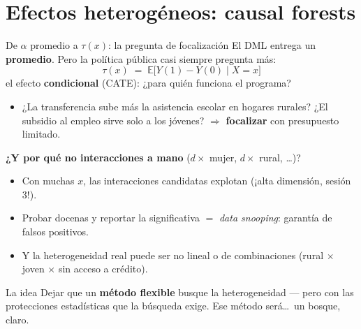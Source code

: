 \documentclass{beamer}
\newcommand{\E}{\mathbb{E}}
\newcommand{\1}{\mathbb{I}}
\begin{document}
\section{Efectos heterogéneos: causal forests}
\begin{frame}[noframenumbering]
\tableofcontents[currentsection]
\end{frame}

\begin{frame}{De $\alpha$ promedio a $\tau(x)$: la pregunta de focalización}
\small
El DML entrega un \textbf{promedio}. Pero la política pública casi siempre pregunta más:
\[ \tau(x) \;=\; \E\big[ Y(1) - Y(0) \mid X = x \big] \]
el efecto \textbf{condicional} (CATE): ¿para quién funciona el programa?
\pause

\begin{itemize}\itemsep4pt
  \item ¿La transferencia sube más la asistencia escolar en hogares rurales? ¿El subsidio al empleo sirve solo a los jóvenes? $\Rightarrow$ \textbf{focalizar} con presupuesto limitado.
\end{itemize}
\pause

\vspace{0.15cm}
\textbf{¿Y por qué no interacciones a mano} ($d \times$ mujer, $d \times$ rural, \ldots)?
\begin{itemize}\itemsep4pt
  \item Con muchas $x$, las interacciones candidatas explotan (¡alta dimensión, sesión 3!).
  \item Probar docenas y reportar la significativa $=$ \emph{data snooping}: garantía de falsos positivos.
  \item Y la heterogeneidad real puede ser no lineal o de combinaciones (rural $\times$ joven $\times$ sin acceso a crédito). \pause
\end{itemize}

\begin{block}{La idea}
Dejar que un \textbf{método flexible} busque la heterogeneidad --- pero con las protecciones estadísticas que la búsqueda exige. Ese método será\ldots\ un bosque, claro.
\end{block}
\end{frame}
\end{document}
